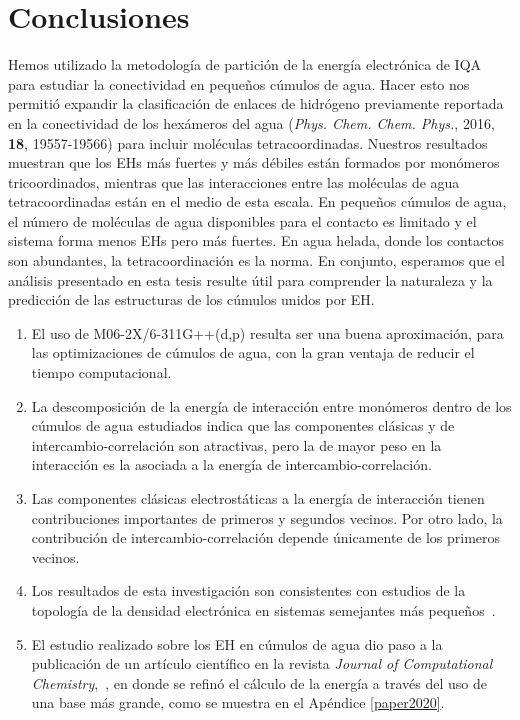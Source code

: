 \chapter{Conclusiones}

Hemos utilizado la metodología de partición de la energía electrónica de IQA
para estudiar la conectividad en pequeños cúmulos de agua. Hacer esto nos
permitió expandir la clasificación de enlaces de hidrógeno previamente
reportada  en la conectividad de los hexámeros del agua (\textit{Phys. Chem.
Chem. Phys.}, 2016, \textbf{18}, 19557-19566) para incluir moléculas
tetracoordinadas. Nuestros resultados muestran que los EHs más fuertes y más
débiles están formados por monómeros tricoordinados, mientras que las
interacciones entre las moléculas de agua tetracoordinadas están en el medio de
esta escala. En pequeños cúmulos de agua, el número de moléculas de agua
disponibles para el contacto es limitado y el sistema forma menos EHs pero más
fuertes. En agua helada, donde los contactos son abundantes, la
tetracoordinación es la norma. En conjunto, esperamos que el análisis
presentado en esta tesis resulte útil para comprender la naturaleza y la
predicción de las estructuras de los cúmulos unidos por EH.

\newpage

\begin{enumerate}
  \item El uso de M06-2X/6-311G++(d,p) resulta ser una buena aproximación, para
  las optimizaciones de cúmulos de agua, con la gran ventaja de reducir el tiempo
  computacional.
  
  \item La descomposición de la energía de interacción entre monómeros dentro de
  los cúmulos de agua estudiados indica que las componentes clásicas y de
  intercambio-correlación son atractivas, pero la de mayor peso en la interacción
  es la asociada a la energía de intercambio-correlación. 
  
  \item Las componentes clásicas electrostáticas a la energía de interacción
  tienen contribuciones importantes de primeros y segundos vecinos. Por otro
  lado, la contribución de intercambio-correlación depende únicamente de los
  primeros vecinos.
  
  \item Los resultados de esta investigación son consistentes con estudios de la
  topología de la densidad electrónica en sistemas semejantes más
  pequeños~\cite{tomas, Toche2016}.
  
  \item El estudio realizado sobre los EH en cúmulos de agua dio paso a la
  publicación de un artículo científico en la revista \textit{Journal of
  Computational Chemistry},~, en donde se refinó el cálculo
  de la energía a través del uso de una base más grande, como se muestra en el
  Apéndice \ref{paper2020}.

\end{enumerate}

\newpage
\thispagestyle{empty}

